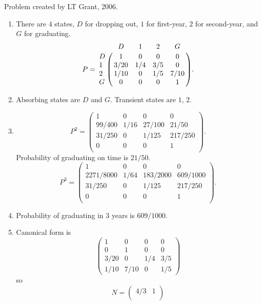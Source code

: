 \documentclass[12pt]{article}
\begin{document}
\begin{solution}
    Problem created by LT Grant, 2006.
    \begin{enumerate}[label=(\alph*)]
    \item
        There are \( 4 \) states, \( D \) for dropping out, \( 1 \) for
        first-year, \( 2 \) for second-year, and \( G \) for graduating.
        \[
            P = \bordermatrix{ & D & 1 & 2 & G \cr
            D& 1 & 0 & 0 & 0 \cr
            1& 3/20 & 1/4 & 3/5 & 0 \cr
            2& 1/10 & 0 & 1/5 & 7/10 \cr
            G& 0 & 0 & 0 & 1 }.
        \]
    \item
        Absorbing states are \( D \) and \( G \).  Transient states are \(
        1 \), \( 2 \).
    \item
        \[
            P^2 =
            \begin{pmatrix}
                1 & 0 & 0 & 0 \\
                99/400 & 1/16 & 27/100 & 21/50 \\
                31/250 & 0 & 1/125 & 217/250 \\
                0 & 0 & 0 & 1 \\
            \end{pmatrix}
            .
        \] Probability of graduating on time is \( 21/50 \).
        \[
            P^3 =
            \begin{pmatrix}
                1 & 0 & 0 & 0 \\
                2271/8000 & 1/64 & 183/2000 & 609/1000 \\
                31/250 & 0 & 1/125 & 217/250 \\
                0 & 0 & 0 & 1 \\
            \end{pmatrix}
            .
        \]
    \item
        Probability of graduating in \( 3 \) years is \( 609/1000 \).
    \item
        Canonical form is
        \[
            \begin{pmatrix}
                1 & 0 & 0 & 0 \\
                0 & 1 & 0 & 0 \\
                3/20 & 0 & 1/4 & 3/5 \\
                1/10 & 7/10& 0 & 1/5
            \end{pmatrix}
        \] so
        \[
            N =
            \begin{pmatrix}
                4/3 & 1 \\

\end{pmatrix}\]
\end{enumerate}
\end{solution}
\end{document}
